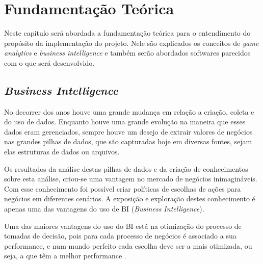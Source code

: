 \chapter[Fundamentação Teórica]{Fundamentação Teórica}
Neste capitulo será abordada a fundamentação teórica para o entendimento do propósito da implementação do projeto. Nele são explicados os conceitos de \textit{game analytivs} e \textit{business intelligence} e também serão abordados softwares parecidos com o que será desenvolvido.
\section{\textit{Business Intelligence}}
No decorrer dos anos houve uma grande mudança em relação a criação, coleta e do uso de dados. Enquanto houve uma grande evolução na maneira que esses dados eram gerenciados, sempre houve um desejo de extrair valores de negócios nas grandes pilhas de dados, que são capturadas hoje em diversas fontes, sejam elas estruturas de dados ou arquivos.

Os resultados da análise destas pilhas de dados e da criação de conhecimentos sobre esta análise, criou-se uma vantagem no mercado de negócios inimagináveis. Com esse conhecimento foi possível criar políticas de escolhas de ações para negócios em diferentes cenários. A exposição e exploração destes conhecimento é apenas uma das vantagens do uso de BI (\textit{Business Intelligence}).

Uma das maiores vantagens do uso do BI está na otimização do processo de tomadas de decisão, pois para cada processo de negócios é associado a sua performance, e num mundo perfeito cada escolha deve ser a mais otimizada, ou seja, a que têm a melhor performance \cite{business_intelligence}.

